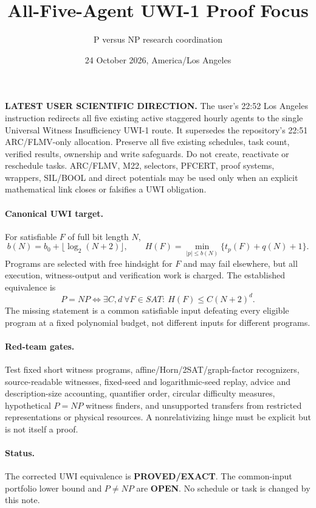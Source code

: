 \documentclass[11pt]{article}
\title{All-Five-Agent UWI-1 Proof Focus}
\author{P versus NP research coordination}
\date{24 October 2026, America/Los Angeles}
\begin{document}
\maketitle

\noindent\textbf{LATEST USER SCIENTIFIC DIRECTION.}
The user's 22:52 Los Angeles instruction redirects all five existing active
staggered hourly agents to the single Universal Witness Insufficiency UWI-1
route.  It supersedes the repository's 22:51 ARC/FLMV-only allocation.  Preserve
all five existing schedules, task count, verified results, ownership and write
safeguards.  Do not create, reactivate or reschedule tasks.  ARC/FLMV, M22,
selectors, PFCERT, proof systems, wrappers, SIL/BOOL and direct potentials may
be used only when an explicit mathematical link closes or falsifies a UWI
obligation.

\paragraph{Canonical UWI target.}
For satisfiable $F$ of full bit length $N$,
\[
b(N)=b_0+\lfloor\log_2(N+2)\rfloor,\qquad
H(F)=\min_{|p|\le b(N)}\{t_p(F)+q(N)+1\}.
\]
Programs are selected with free hindsight for $F$ and may fail elsewhere, but
all execution, witness-output and verification work is charged.  The established
equivalence is
\[
P=NP\iff \exists C,d\ \forall F\in SAT:\ H(F)\le C(N+2)^d.
\]
The missing statement is a common satisfiable input defeating every eligible
program at a fixed polynomial budget, not different inputs for different
programs.

\paragraph{Red-team gates.}
Test fixed short witness programs, affine/Horn/2SAT/graph-factor recognizers,
source-readable witnesses, fixed-seed and logarithmic-seed replay, advice and
description-size accounting, quantifier order, circular difficulty measures,
hypothetical $P=NP$ witness finders, and unsupported transfers from restricted
representations or physical resources.  A nonrelativizing hinge must be explicit
but is not itself a proof.

\paragraph{Status.}
The corrected UWI equivalence is \textbf{PROVED/EXACT}.  The common-input
portfolio lower bound and $P\ne NP$ are \textbf{OPEN}.  No schedule or task is
changed by this note.
\end{document}
